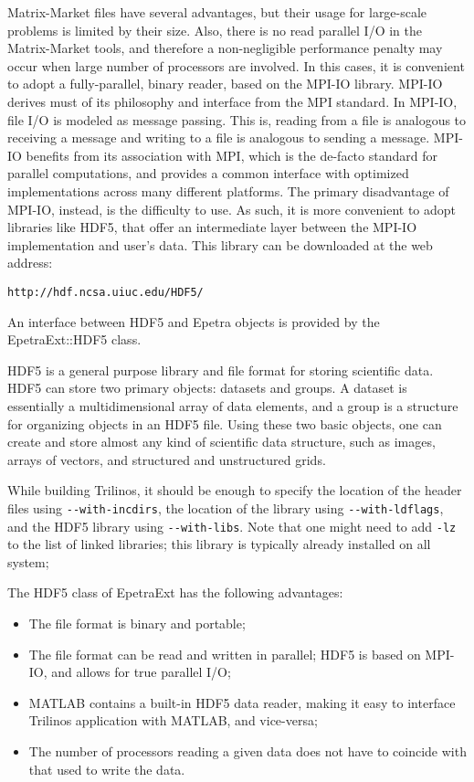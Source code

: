 \documentclass[11pt,relax]{SANDreport}
\begin{document}
Matrix-Market files have several advantages, but their usage for large-scale
problems is limited by their size. Also, there is no read parallel I/O in the
Matrix-Market tools, and therefore a non-negligible performance penalty may
occur when large number of processors are involved. In this cases, it is
convenient to adopt a fully-parallel, binary reader, based on the MPI-IO
library. MPI-IO derives must of its philosophy and interface from the MPI
standard. In MPI-IO, file I/O is modeled as message passing. This is, reading
from a file is analogous to receiving a message and writing to a file is
analogous to sending a message. MPI-IO benefits from its association with MPI,
which is the de-facto standard for parallel computations, and provides a
common interface with optimized implementations across many different
platforms. The primary disadvantage of MPI-IO, instead, is the difficulty to
use. As such, it is more convenient to adopt libraries like HDF5, that offer
an intermediate layer between the MPI-IO implementation and user's data. This
library can be downloaded  at the web address:
\begin{verbatim}
http://hdf.ncsa.uiuc.edu/HDF5/
\end{verbatim}
An interface between HDF5 and Epetra objects is provided by the
EpetraExt::HDF5 class.

HDF5 is a general purpose library and file format for storing scientific data.
HDF5 can store two primary objects: datasets and groups. A dataset is
essentially a multidimensional array of data elements, and a group is a
structure for organizing objects in an HDF5 file. Using these two basic
objects, one can create and store almost any kind of scientific data
structure, such as images, arrays of vectors, and structured and unstructured
grids.

While building Trilinos, it should be enough to specify the location of the
header files using \verb!--with-incdirs!, the location of the library using
\verb!--with-ldflags!, and the HDF5 library using \verb!--with-libs!. Note
that one might need to add \verb!-lz! to the list of linked libraries; this library
is typically already installed on all system;

The HDF5 class of EpetraExt has the following advantages:
\begin{itemize}
\item The file format is binary and portable;
\item The file format can be read and written in parallel;
HDF5 is based on MPI-IO, and allows for true parallel I/O;
\item MATLAB contains a built-in HDF5 data reader, making it easy to interface
Trilinos application with MATLAB, and vice-versa;
\item The number of processors reading a given
data does not have to coincide with that used to write the data.
\end{itemize}
\end{document}
